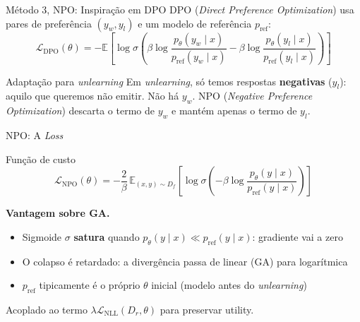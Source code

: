 \documentclass[aspectratio=169,xcolor=dvipsnames]{beamer}
\begin{document}
  \begin{frame}{Método 3, NPO: Inspiração em DPO}
    DPO (\textit{Direct Preference Optimization}) usa pares de preferência $(y_w, y_l)$ e um modelo de referência $p_{\text{ref}}$:
    \[
      \mathcal{L}_{\text{DPO}}(\theta) = -\mathbb{E}\left[\log \sigma\left(
        \beta \log\frac{p_\theta(y_w \mid x)}{p_{\text{ref}}(y_w \mid x)}
        - \beta \log\frac{p_\theta(y_l \mid x)}{p_{\text{ref}}(y_l \mid x)}
      \right)\right]
    \]

    \vspace{0.3em}
    \begin{block}{Adaptação para \textit{unlearning}}
      Em \textit{unlearning}, só temos respostas \textbf{negativas} ($y_l$): aquilo que queremos não emitir. Não há $y_w$. NPO (\textit{Negative Preference Optimization}) descarta o termo de $y_w$ e mantém apenas o termo de $y_l$.
    \end{block}
  \end{frame}

  \begin{frame}{NPO: A \textit{Loss}}
    \begin{block}{Função de custo}
      \[
        \mathcal{L}_{\text{NPO}}(\theta) = -\frac{2}{\beta}\, \mathbb{E}_{(x,y) \sim D_f}\left[
          \log \sigma\left( -\beta \log \frac{p_\theta(y \mid x)}{p_{\text{ref}}(y \mid x)} \right)
        \right]
      \]
    \end{block}

    \vspace{0.3em}
    \textbf{Vantagem sobre GA.}
    \begin{itemize}\setlength{\itemsep}{0pt}
      \item Sigmoide $\sigma$ \textbf{satura} quando $p_\theta(y \mid x) \ll p_{\text{ref}}(y \mid x)$: gradiente vai a zero
      \item O colapso é retardado: a divergência passa de linear (GA) para logarítmica
      \item $p_{\text{ref}}$ tipicamente é o próprio $\theta$ inicial (modelo antes do \textit{unlearning})
    \end{itemize}

    \vspace{0.3em}
    Acoplado ao termo $\lambda \mathcal{L}_{\text{NLL}}(D_r, \theta)$ para preservar utility.
  \end{frame}
\end{document}
